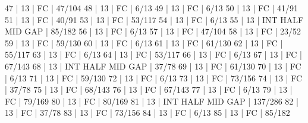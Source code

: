 47    |  13    |    FC                                        | 47/104   
48    |  13    |    FC                                        | 6/13   
49    |  13    |    FC                                        | 6/13   
50    |  13    |    FC                                        | 41/91   
51    |  13    |    FC                                        | 40/91   
53    |  13    |    FC                                        | 53/117   
54    |  13    |    FC                                        | 6/13   
55    |  13    |        INT  HALF            MID  GAP         | 85/182   
56    |  13    |    FC                                        | 6/13   
57    |  13    |    FC                                        | 47/104   
58    |  13    |    FC                                        | 23/52   
59    |  13    |    FC                                        | 59/130   
60    |  13    |    FC                                        | 6/13   
61    |  13    |    FC                                        | 61/130   
62    |  13    |    FC                                        | 55/117   
63    |  13    |    FC                                        | 6/13   
64    |  13    |    FC                                        | 53/117   
66    |  13    |    FC                                        | 6/13   
67    |  13    |    FC                                        | 67/143   
68    |  13    |        INT  HALF            MID  GAP         | 37/78   
69    |  13    |    FC                                        | 61/130   
70    |  13    |    FC                                        | 6/13   
71    |  13    |    FC                                        | 59/130   
72    |  13    |    FC                                        | 6/13   
73    |  13    |    FC                                        | 73/156   
74    |  13    |    FC                                        | 37/78   
75    |  13    |    FC                                        | 68/143   
76    |  13    |    FC                                        | 67/143   
77    |  13    |    FC                                        | 6/13   
79    |  13    |    FC                                        | 79/169   
80    |  13    |    FC                                        | 80/169   
81    |  13    |        INT  HALF            MID  GAP         | 137/286   
82    |  13    |    FC                                        | 37/78   
83    |  13    |    FC                                        | 73/156   
84    |  13    |    FC                                        | 6/13   
85    |  13    |    FC                                        | 85/182   
